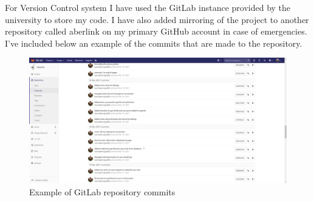 For Version Control system I have used the GitLab instance provided by the university to store my code. I have also added mirroring of the project to another repository called aberlink on my primary GitHub account in case of emergencies. I've included below an example of the commits that are made to the repository.
\begin{figure}[H]
	\centering
	\includegraphics[width=1\textwidth]{Figures/gitlab.png}	
	\caption{Example of GitLab repository commits}
	\label{fig:gitlab}
\end{figure}
